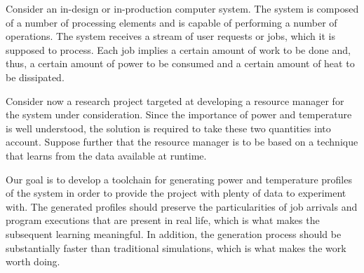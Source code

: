 Consider an in-design or in-production computer system. The system is composed
of a number of processing elements and is capable of performing a number of
operations. The system receives a stream of user requests or jobs, which it is
supposed to process. Each job implies a certain amount of work to be done and,
thus, a certain amount of power to be consumed and a certain amount of heat to
be dissipated.

Consider now a research project targeted at developing a resource manager for
the system under consideration. Since the importance of power and temperature is
well understood, the solution is required to take these two quantities into
account. Suppose further that the resource manager is to be based on a technique
that learns from the data available at runtime.

Our goal is to develop a toolchain for generating power and temperature profiles
of the system in order to provide the project with plenty of data to experiment
with. The generated profiles should preserve the particularities of job arrivals
and program executions that are present in real life, which is what makes the
subsequent learning meaningful. In addition, the generation process should be
substantially faster than traditional simulations, which is what makes the work
worth doing.
